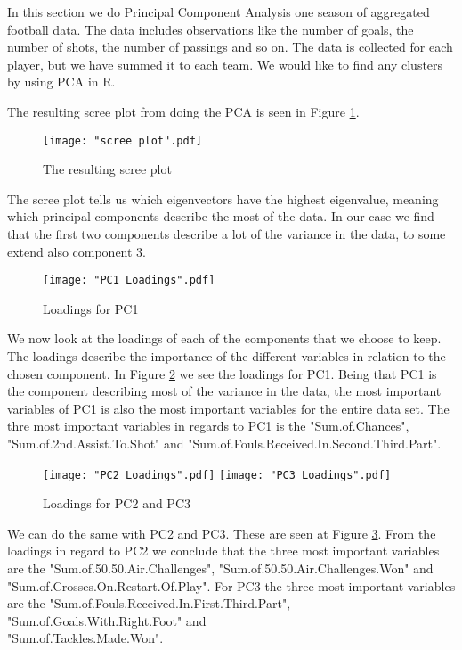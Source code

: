 \documentclass[Report.tex]{subfiles}
\begin{document}
In this section we do Principal Component Analysis one season of aggregated football data. The data includes observations like the number of goals, the number of shots, the number of passings and so on. The data is collected for each player, but we have summed it to each team. We would like to find any clusters by using PCA in R.

The resulting scree plot from doing the PCA is seen in Figure \ref{fig:scree}.
\begin{figure}
\center
\texttt{[image: "scree plot".pdf]}
\caption{The resulting scree plot}
\label{fig:scree}
\end{figure}
The scree plot tells us which eigenvectors have the highest eigenvalue, meaning which principal components describe the most of the data. In our case we find that the first two components describe a lot of the variance in the data, to some extend also component 3. 

\begin{figure}
\center
\texttt{[image: "PC1 Loadings".pdf]}
\caption{Loadings for PC1}
\label{fig:PC1Loadings}

\end{figure}
We now look at the loadings of each of the components that we choose to keep. The loadings describe the importance of the different variables in relation to the chosen component. In Figure \ref{fig:PC1Loadings} we see the loadings for PC1. Being that PC1 is the component describing most of the variance in the data, the most important variables of PC1 is also the most important variables for the entire data set. The thre most important variables in regards to PC1 is the "Sum.of.Chances", "Sum.of.2nd.Assist.To.Shot" and "Sum.of.Fouls.Received.In.Second.Third.Part".

\begin{figure}
\center
\texttt{[image: "PC2 Loadings".pdf]}
\texttt{[image: "PC3 Loadings".pdf]}
\caption{Loadings for PC2 and PC3}
\label{fig:PC23Loadings}
\end{figure}

We can do the same with PC2 and PC3. These are seen at Figure \ref{fig:PC23Loadings}. From the loadings in regard to PC2 we conclude that the three most important variables are the "Sum.of.50.50.Air.Challenges", "Sum.of.50.50.Air.Challenges.Won" and\\ "Sum.of.Crosses.On.Restart.Of.Play".
For PC3 the three most important variables are the "Sum.of.Fouls.Received.In.First.Third.Part", "Sum.of.Goals.With.Right.Foot" and \\ "Sum.of.Tackles.Made.Won".
\end{document}
